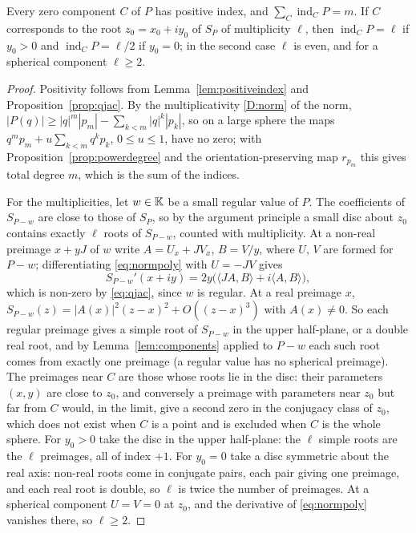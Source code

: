 \begin{proposition}\label{prop:normmult}
Every zero component $C$ of $P$ has positive index, and $\sum_C\operatorname{ind}_CP=m$. If $C$ corresponds to the root $z_0=x_0+iy_0$ of $S_P$ of multiplicity $\ell$, then $\operatorname{ind}_CP=\ell$ if $y_0>0$ and $\operatorname{ind}_CP=\ell/2$ if $y_0=0$; in the second case $\ell$ is even, and for a spherical component $\ell\ge2$.
\end{proposition}

\begin{proof}
Positivity follows from Lemma~\ref{lem:positiveindex} and Proposition~\ref{prop:qjac}. By the multiplicativity \ref{D:norm} of the norm, $|P(q)|\ge|q|^m|p_m|-\sum_{k<m}|q|^k|p_k|$, so on a large sphere the maps $q^mp_m+u\sum_{k<m}q^kp_k$, $0\le u\le1$, have no zero; with Proposition~\ref{prop:powerdegree} and the orientation-preserving map $r_{p_m}$ this gives total degree $m$, which is the sum of the indices.

For the multiplicities, let $w\in\mathbb{K}$ be a small regular value of $P$. The coefficients of $S_{P-w}$ are close to those of $S_P$, so by the argument principle a small disc about $z_0$ contains exactly $\ell$ roots of $S_{P-w}$, counted with multiplicity. At a non-real preimage $x+yJ$ of $w$ write $A=U_x+JV_x$, $B=V/y$, where $U$, $V$ are formed for $P-w$; differentiating \eqref{eq:normpoly} with $U=-JV$ gives
\begin{equation}\label{eq:normderiv}
S_{P-w}'(x+iy)=2y\bigl(\langle JA,B\rangle+i\langle A,B\rangle\bigr),
\end{equation}
which is non-zero by \eqref{eq:qjac}, since $w$ is regular. At a real preimage $x$, $S_{P-w}(z)=|A(x)|^2(z-x)^2+O((z-x)^3)$ with $A(x)\neq0$. So each regular preimage gives a simple root of $S_{P-w}$ in the upper half-plane, or a double real root, and by Lemma~\ref{lem:components} applied to $P-w$ each such root comes from exactly one preimage (a regular value has no spherical preimage). The preimages near $C$ are those whose roots lie in the disc: their parameters $(x,y)$ are close to $z_0$, and conversely a preimage with parameters near $z_0$ but far from $C$ would, in the limit, give a second zero in the conjugacy class of $z_0$, which does not exist when $C$ is a point and is excluded when $C$ is the whole sphere. For $y_0>0$ take the disc in the upper half-plane: the $\ell$ simple roots are the $\ell$ preimages, all of index $+1$. For $y_0=0$ take a disc symmetric about the real axis: non-real roots come in conjugate pairs, each pair giving one preimage, and each real root is double, so $\ell$ is twice the number of preimages. At a spherical component $U=V=0$ at $z_0$, and the derivative of \eqref{eq:normpoly} vanishes there, so $\ell\ge2$.
\end{proof}

